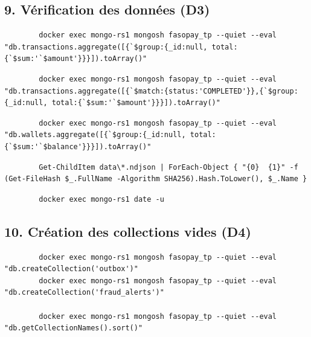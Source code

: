\documentclass[11pt,a4paper]{article}
\begin{document}
	\subsection*{9. Vérification des données (D3)}
	\begin{lstlisting}
		docker exec mongo-rs1 mongosh fasopay_tp --quiet --eval "db.transactions.aggregate([{`$group:{_id:null, total:{`$sum:'`$amount'}}}]).toArray()"
	\end{lstlisting}
	\begin{lstlisting}
		docker exec mongo-rs1 mongosh fasopay_tp --quiet --eval "db.transactions.aggregate([{`$match:{status:'COMPLETED'}},{`$group:{_id:null, total:{`$sum:'`$amount'}}}]).toArray()"
	\end{lstlisting}
	\begin{lstlisting}
		docker exec mongo-rs1 mongosh fasopay_tp --quiet --eval "db.wallets.aggregate([{`$group:{_id:null, total:{`$sum:'`$balance'}}}]).toArray()"
	\end{lstlisting}
	\begin{lstlisting}
		Get-ChildItem data\*.ndjson | ForEach-Object { "{0}  {1}" -f (Get-FileHash $_.FullName -Algorithm SHA256).Hash.ToLower(), $_.Name }
	\end{lstlisting}
	\begin{lstlisting}
		docker exec mongo-rs1 date -u
	\end{lstlisting}
	\subsection*{10. Création des collections vides (D4)}
	\begin{lstlisting}
		docker exec mongo-rs1 mongosh fasopay_tp --quiet --eval "db.createCollection('outbox')"
		docker exec mongo-rs1 mongosh fasopay_tp --quiet --eval "db.createCollection('fraud_alerts')"
		
		docker exec mongo-rs1 mongosh fasopay_tp --quiet --eval "db.getCollectionNames().sort()"
	\end{lstlisting}
\end{document}
